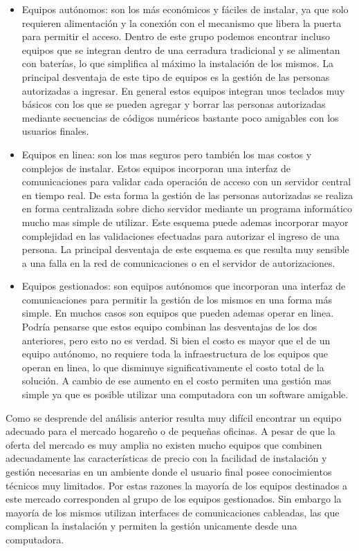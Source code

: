 \begin{itemize}
	\item Equipos autónomos: son los más económicos y fáciles de instalar, ya que solo requieren alimentación y la conexión con el mecanismo que libera la puerta para permitir el acceso. Dentro de este grupo podemos encontrar incluso equipos que se integran dentro de una cerradura tradicional y se alimentan con baterías, lo que simplifica al máximo la instalación de los mismos. La principal desventaja de este tipo de equipos es la gestión de las personas autorizadas a ingresar. En general estos equipos integran unos teclados muy básicos con los que se pueden agregar y borrar las personas autorizadas mediante secuencias de códigos numéricos bastante poco amigables con los usuarios finales.
	\item Equipos en linea: son los mas seguros pero también los mas costos y complejos de instalar. Estos equipos incorporan una interfaz de comunicaciones para validar cada operación de acceso con un servidor central en tiempo real. De esta forma la gestión de las personas autorizadas se realiza en forma centralizada sobre dicho servidor mediante un programa informático mucho mas simple de utilizar. Este esquema puede ademas incorporar mayor complejidad en las validaciones efectuadas para autorizar el ingreso de una persona. La principal desventaja de este esquema es que resulta muy sensible a una falla en la red de comunicaciones o en el servidor de autorizaciones.
	\item Equipos gestionados: son equipos autónomos que incorporan una interfaz de comunicaciones para permitir la gestión de los mismos en una forma más simple. En muchos casos son equipos que pueden ademas operar en linea. Podría pensarse que estos equipo combinan las desventajas de los dos anteriores, pero esto no es verdad. Si bien el costo es mayor que el de un equipo autónomo,  no requiere toda la infraestructura de los equipos que operan en linea, lo que disminuye significativamente el costo total de la solución. A cambio de ese aumento en el costo permiten una gestión mas simple ya que es posible utilizar una computadora con un software amigable.
\end{itemize}

Como se desprende del análisis anterior resulta muy difícil encontrar un equipo adecuado para el mercado hogareño o de pequeñas oficinas. A pesar de que la oferta del mercado es muy amplia no existen mucho equipos que combinen adecuadamente las características de precio con la facilidad de instalación y gestión necesarias en un ambiente donde el usuario final posee conocimientos técnicos muy limitados. Por estas razones la mayoría de los equipos destinados a este mercado corresponden al grupo de los equipos gestionados. Sin embargo la mayoría de los mismos utilizan interfaces de comunicaciones cableadas, las que complican la instalación y permiten la gestión unicamente desde una computadora.

